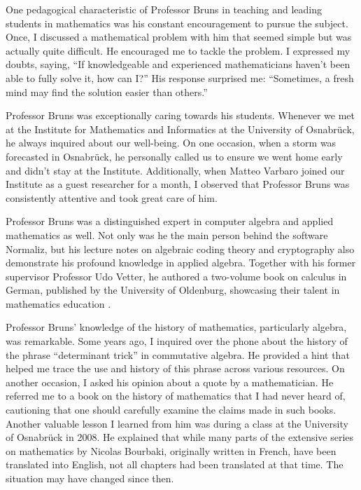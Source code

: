 \documentclass[10pt]{amsart}
\begin{document}
	One pedagogical characteristic of Professor Bruns in teaching and leading students in mathematics was his constant encouragement to pursue the subject. Once, I discussed a mathematical problem with him that seemed simple but was actually quite difficult. He encouraged me to tackle the problem. I expressed my doubts, saying, ``If knowledgeable and experienced mathematicians haven't been able to fully solve it, how can I?'' His response surprised me: ``Sometimes, a fresh mind may find the solution easier than others.''
	
	Professor Bruns was exceptionally caring towards his students. Whenever we met at the Institute for Mathematics and Informatics at the University of Osnabr\"{u}ck, he always inquired about our well-being. On one occasion, when a storm was forecasted in Osnabr\"{u}ck, he personally called us to ensure we went home early and didn't stay at the Institute. Additionally, when Matteo Varbaro joined our Institute as a guest researcher for a month, I observed that Professor Bruns was consistently attentive and took great care of him.
	
	Professor Bruns was a distinguished expert in computer algebra and applied mathematics as well. Not only was he the main person behind the software Normaliz, but his lecture notes on algebraic coding theory and cryptography also demonstrate his profound knowledge in applied algebra. Together with his former supervisor Professor Udo Vetter, he authored a two-volume book on calculus in German, published by the University of Oldenburg, showcasing their talent in mathematics education \cite{BrunsVetter2003}.
	
	Professor Bruns' knowledge of the history of mathematics, particularly algebra, was remarkable. Some years ago, I inquired over the phone about the history of the phrase ``determinant trick'' in commutative algebra. He provided a hint that helped me trace the use and history of this phrase across various resources. On another occasion, I asked his opinion about a quote by a mathematician. He referred me to a book on the history of mathematics that I had never heard of, cautioning that one should carefully examine the claims made in such books. Another valuable lesson I learned from him was during a class at the University of Osnabr\"{u}ck in 2008. He explained that while many parts of the extensive series on mathematics by Nicolas Bourbaki, originally written in French, have been translated into English, not all chapters had been translated at that time. The situation may have changed since then.
	
\end{document}
